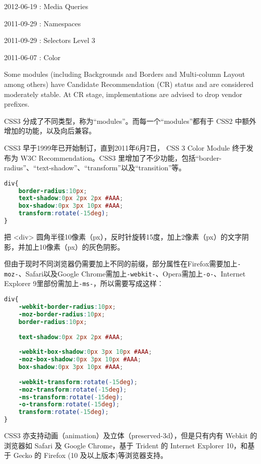 \begin{compactitem}
\item 2012-06-19 : Media Queries
\item 2011-09-29 : Namespaces
\item 2011-09-29 : Selectors Level 3
\item 2011-06-07 : Color
\end{compactitem}

Some modules (including Backgrounds and Borders and Multi-column Layout among others) have Candidate Recommendation (CR) status and are considered moderately stable. At CR stage, implementations are advised to drop vendor prefixes.

CSS3 分成了不同类型，称为“modules”。而每一个“modules”都有于 CSS2 中额外增加的功能，以及向后兼容。

CSS3 早于1999年已开始制订，直到2011年6月7日， CSS 3 Color Module 终于发布为 W3C Recommendation。CSS3 里增加了不少功能，包括“border-radius”、“text-shadow”、“transform”以及“transition”等。


\begin{lstlisting}[language=CSS]
div{
    border-radius:10px;
    text-shadow:0px 2px 2px #AAA;
    box-shadow:0px 3px 10px #AAA;
    transform:rotate(-15deg);
}
\end{lstlisting}

把 <div> 圆角半径10像素（px），反时针旋转15度，加上2像素（px）的文字阴影，并加上10像素（px）的灰色阴影。


但由于现时不同浏览器仍需要加上不同的前缀，部分属性在Firefox需要加上\texttt{-moz-}、Safari以及Google Chrome需加上\texttt{-webkit-}、Opera需加上\texttt{-o-}、Internet Explorer 9里部份需加上\texttt{-ms-}，所以需要写成这样︰

\begin{lstlisting}[language=CSS]
div{
    -webkit-border-radius:10px;
    -moz-border-radius:10px;
    border-radius:10px;
 
    text-shadow:0px 2px 2px #AAA;
 
    -webkit-box-shadow:0px 3px 10px #AAA;
    -moz-box-shadow:0px 3px 10px #AAA;
    box-shadow:0px 3px 10px #AAA;
 
    -webkit-transform:rotate(-15deg);
    -moz-transform:rotate(-15deg);
    -ms-transform:rotate(-15deg);
    -o-transform:rotate(-15deg);
    transform:rotate(-15deg);
}
\end{lstlisting}

CSS3 亦支持动画（animation）及立体（preserved-3d），但是只有内有 Webkit 的浏览器如 Safari 及 Google Chrome，基于 Trident 的 Internet Explorer 10，和基于 Gecko 的 Firefox (10 及以上版本)等浏览器支持。



